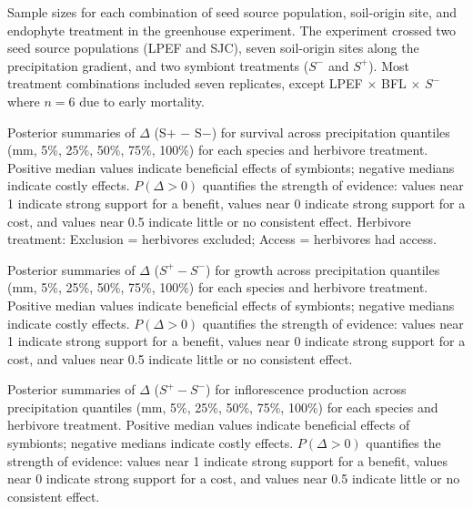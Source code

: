 \documentclass[12pt]{article}\usepackage[]{graphicx}\usepackage[dvipsnames]{xcolor}
\begin{document}
\begin{table}[ht]
 \caption{Sample sizes for each combination of seed source population, soil-origin site, and endophyte treatment in the greenhouse experiment.
The experiment crossed two seed source populations (LPEF and SJC), seven soil-origin sites along the precipitation gradient, and two symbiont treatments ($S^-$ and $S^+$). Most treatment combinations included seven replicates, except LPEF $\times$ BFL $\times$ $S^-$ where $n = 6$ due to early mortality.}   
    \centering
    \small
    
    \label{tab:soil_pop}
\end{table}
\clearpage


\clearpage

\begin{table}[ht]
    \centering
    \caption{
    Posterior summaries of $\Delta$ (S$+$ $-$ S$-$) for survival across precipitation quantiles (mm, 5\%, 25\%, 50\%, 75\%, 100\%) for each species and herbivore treatment.
    Positive median values indicate beneficial effects of symbionts; negative medians indicate costly effects.
    $P(\Delta>0)$ quantifies the strength of evidence: values near 1 indicate strong support for a benefit, values near 0 indicate strong support for a cost, and values near 0.5 indicate little or no consistent effect.
    Herbivore treatment: Exclusion = herbivores excluded; Access = herbivores had access.
    }
    \label{tab:delta_summary_surv_quantiles}
    
\end{table}
\clearpage

\begin{table}[ht]
    \centering
    \caption{Posterior summaries of $\Delta$ ($S^+ - S^-$) for growth across precipitation quantiles (mm, 5\%, 25\%, 50\%, 75\%, 100\%) for each species and herbivore treatment.
    Positive median values indicate beneficial effects of symbionts; negative medians indicate costly effects. 
    $P(\Delta>0)$ quantifies the strength of evidence: values near 1 indicate
    strong support for a benefit, values near 0 indicate strong support for a cost, and values near 0.5 indicate little or no consistent effect.}
    \label{tab:delta_summary_grow}
    
\end{table}
\clearpage

\begin{table}[ht]
    \centering
    \caption{Posterior summaries of $\Delta$ ($S^+ - S^-$) for inflorescence production across precipitation quantiles (mm, 5\%, 25\%, 50\%, 75\%, 100\%) for each species and herbivore treatment.
    Positive median values indicate beneficial effects of symbionts; negative medians indicate costly effects.
    $P(\Delta>0)$ quantifies the strength of evidence: values near 1 indicate strong support for a benefit, values near 0 indicate strong support for a cost, and values near 0.5 indicate little or no consistent effect.}
    \label{tab:delta_summary_flow}
    
\end{table}
\clearpage
\end{document}
